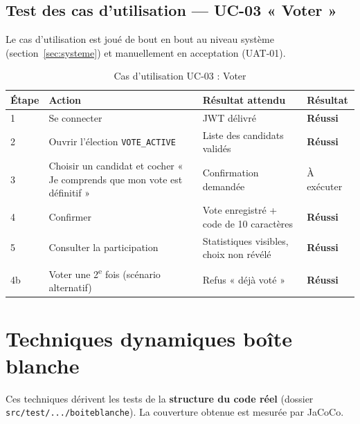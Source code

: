 \documentclass[12pt,a4paper]{report}
\newcommand{\ok}{\textcolor{okgreen}{\textbf{Réussi}}}
\newcommand{\aex}{\textcolor{paorange}{À exécuter}}
\begin{document}
\subsection{Test des cas d'utilisation --- UC-03 « Voter »}
Le cas d'utilisation est joué de bout en bout au niveau système (section~\ref{sec:systeme}) et manuellement en acceptation (UAT-01).
\begin{table}[H]
\centering
\caption{Cas d'utilisation UC-03 : Voter}
\small
\begin{tabularx}{\textwidth}{@{}p{1cm}p{6.2cm}Xp{1.8cm}@{}}
\toprule
\rowcolor{evlight}\textbf{Étape} & \textbf{Action} & \textbf{Résultat attendu} & \textbf{Résultat}\\
\midrule
1 & Se connecter & JWT délivré & \ok\\
2 & Ouvrir l'élection \texttt{VOTE\_ACTIVE} & Liste des candidats validés & \ok\\
3 & Choisir un candidat et cocher « Je comprends que mon vote est définitif » & Confirmation demandée & \aex\\
4 & Confirmer & Vote enregistré + code de 10 caractères & \ok\\
5 & Consulter la participation & Statistiques visibles, choix non révélé & \ok\\
4b & Voter une 2\textsuperscript{e} fois (scénario alternatif) & Refus « déjà voté » & \ok\\
\bottomrule
\end{tabularx}
\end{table}

\section{Techniques dynamiques boîte blanche}

Ces techniques dérivent les tests de la \textbf{structure du code réel} (dossier \nolinkurl{src/test/.../boiteblanche}). La couverture obtenue est mesurée par JaCoCo.
\end{document}
